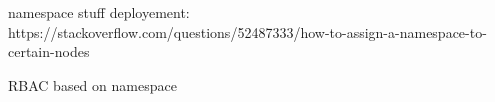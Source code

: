 namespace stuff deployement:
https://stackoverflow.com/questions/52487333/how-to-assign-a-namespace-to-certain-nodes

RBAC based on namespace